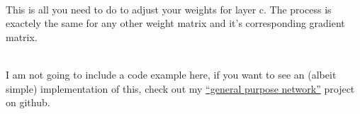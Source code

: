 \documentclass[11pt, halfparskip]{article}
\begin{document}
    \noindent \\
    This is all you need to do to adjust your weights for layer c. The process is exactely the same for any other weight matrix and it's corresponding gradient matrix.
    
    \noindent \\
    I am not going to include a code example here, if you want to see an (albeit simple) implementation of this, check out my 
    \href{https://github.com/LinusSee/learning-ai/tree/master/first-steps/general_purpose_network}{``general purpose network''} project on github.
    
\end{document}
